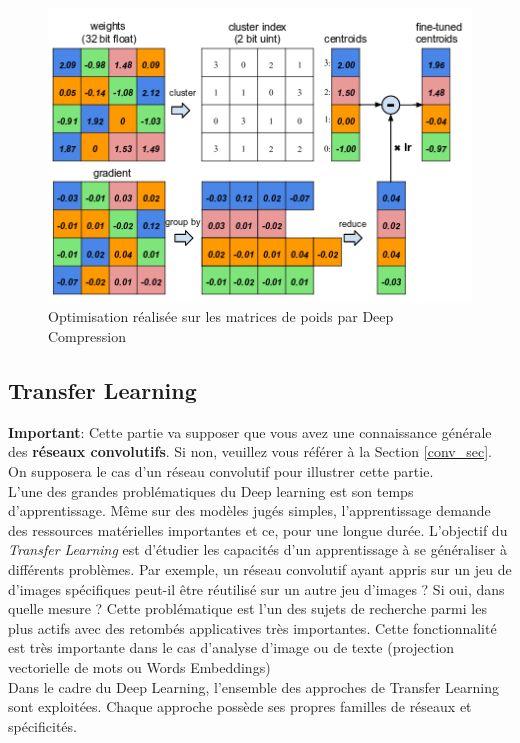 \begin{figure}
    \centering
    \includegraphics[scale=0.4]{./tex/regularisation/deepcomp.png}
    \caption{Optimisation réalisée sur les matrices de poids par Deep Compression}
    \label{deepcomp}
\end{figure}

\subsection{Transfer Learning}
\textbf{Important}: Cette partie va supposer que vous avez une connaissance générale des \textbf{réseaux convolutifs}. Si non, veuillez vous référer à la Section \ref{conv_sec}. On supposera le cas d'un réseau convolutif pour illustrer cette partie.\\

\noindent L'une des grandes problématiques du Deep learning est son temps d'apprentissage. Même sur des modèles jugés simples, l'apprentissage demande des ressources matérielles importantes et ce, pour une longue durée. L'objectif du \textit{Transfer Learning} est d'étudier les capacités d'un apprentissage à se généraliser à différents problèmes. Par exemple, un réseau convolutif ayant appris sur un jeu de d'images spécifiques peut-il être réutilisé sur un autre jeu d'images ? Si oui, dans quelle mesure ? Cette problématique est l'un des sujets de recherche parmi les plus actifs avec des retombés applicatives très importantes. Cette fonctionnalité est très importante dans le cas d'analyse d'image ou de texte (projection vectorielle de mots ou Words Embeddings)\\

\noindent Dans le cadre du Deep Learning, l'ensemble des approches de Transfer Learning sont exploitées. Chaque approche possède ses propres familles de réseaux et spécificités.

